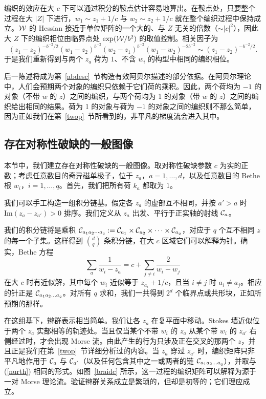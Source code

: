 编织的效应在大 $c$ 下可以通过积分的鞍点估计容易地算出。在鞍点处，只要整个过程在大 $|Z|$ 下进行，$w_1 \sim z_1 + 1/c$ 与 $w_2 \sim z_2 + 1/c$ 就在整个编织过程中保持成立。${\mathcal W}$ 的 Hessian 接近于单位矩阵的一个大的、与 $Z$ 无关的倍数（$\sim| c |^2$），因此大 $Z$ 下的编织相位由临界点处 $\exp({\mathcal W}/b^2)$ 的取值控制。相关因子为
\begin{equation}
(z_1 - z_2)^{-b^{-2}/2} (w_1 - z_2)^{b^{-2}}(w_2 - z_1)^{b^{-2}}(w_1 - w_2)^{-2 b^{-2}} \sim (z_1 - z_2)^{-b^{-2}/2}.
\end{equation}
于是我们重新得到与两个 $z_a$ 荷为 $1$、不含 $w_i$ 的构型中相同的编织相位。

后一陈述将成为第~\ref{abdesc}~节构造有效阿贝尔描述的部分依据。在阿贝尔理论中，人们会预期两个对象的编织只依赖于它们荷的乘积。因此，两个荷均为 $-1$ 的对象（不带 $w$ 的 $z$）之间的编织，与两个荷均为 1 的对象（带 $w$ 的 $z$）之间的编织给出相同的结果。荷为 1 的对象与荷为 $-1$ 的对象之间的编织则不那么简单，因为正如我们在第~\ref{twop}~节所看到的，非平凡的梯度流会进入其中。

\subsection{存在对称性破缺的一般图像}\label{genpicture}
本节中，我们建立存在对称性破缺的一般图像。取对称性破缺参数 $c$ 为实的正数；考虑任意数目的奇异磁单极子，位于 $z_a$，$a=1,\dots,d$，以及任意数目的 Bethe 根 $w_i$，$i=1,\dots,q$。首先，我们把所有荷 $k_a$ 都取为 $1$。

我们可以手工构造一组积分链基。假定各 $z_a$ 的虚部互不相同，并按 $a'>a$ 时 $\mathrm{Im} (z_a- z_{a'}) >0$ 排序。我们定义从 $z_a$ 出发、平行于正实轴的射线 ${\mathcal C}_a$。

我们的积分链将是乘积 ${\mathcal C}_{a_1 a_2\cdots a_q} := 
{\mathcal C}_{a_1} \times{\mathcal C}_{a_2} \times \cdots \times {\mathcal C}_{a_q}$，对应于 $q$ 个互不相同 $z$ 的每一个子集。这样得到 ${d \choose q}$ 条积分链，在大 $c$ 区域它们可以解释为针。确实，Bethe 方程
\begin{equation}
\sum_a \frac{1}{w_i - z_a} = c + \sum_{j \neq i} \frac{2}{w_i - w_j}
\end{equation}
在大 $c$ 时有近似解，其中每个 $w_i$ 近似等于 $z_{a_i}+1/c$，且当 $i\not=j$ 时 $a_i\not=a_j$。相应的针正是 ${\mathcal C}_{a_1a_2\dots a_q}$。对所有 $q$ 求和，我们一共得到 $2^d$ 个临界点或共形块，正如所预期的那样。

在这组基下，辫群表示相当简单。我们让各 $z_a$ 在复平面中移动。Stokes 墙近似位于两个 $z_a$ 实部相等的轨迹处。当且仅当某个不带 $w_i$ 的 $z_a$ 从某个带 $w_i$ 的 $z_{a'}$ 右侧经过时，才会出现 Morse 流。由此产生的行为只涉及正在交叉的那两个 $z$，并且正是我们在第~\ref{twop}~节详细分析过的内容。当 $z_a$ 穿过 $z_{a'}$ 时，编织矩阵只非平凡地作用于 ${\mathcal C}_a$ 与 ${\mathcal C}_{a'}$（以及任何包含其中之一或两者的链 ${\mathcal C}_{a_1a_2\dots a_q}$），并取与 (\ref{nurth}) 相同的形式。如图~\ref{braidc} 所示，这一过程的编织矩阵可以解释为源于一对 Morse 理论流。验证辫群关系成立是繁琐的，但却是初等的；它们理应成立。
